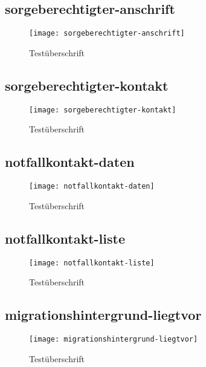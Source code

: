 \begin{landscape}
\subsection{sorgeberechtigter-anschrift}
\begin{figure}[H]
    \centering
    \caption{Testüberschrift}
    \begin{adjustbox}{width=0.85\linewidth, center}
        \texttt{[image: sorgeberechtigter-anschrift]}
    \end{adjustbox}
\end{figure}

\subsection{sorgeberechtigter-kontakt}
\begin{figure}[H]
    \centering
    \caption{Testüberschrift}
    \begin{adjustbox}{width=0.6\linewidth, center}
        \texttt{[image: sorgeberechtigter-kontakt]}
    \end{adjustbox}
\end{figure}

\subsection{notfallkontakt-daten}
\begin{figure}[H]
    \centering
    \caption{Testüberschrift}
    \begin{adjustbox}{width=0.6\linewidth, center}
        \texttt{[image: notfallkontakt-daten]}
    \end{adjustbox}
\end{figure}

\subsection{notfallkontakt-liste}
\begin{figure}[H]
    \centering
    \caption{Testüberschrift}
    \begin{adjustbox}{width=\linewidth, center}
        \texttt{[image: notfallkontakt-liste]}
    \end{adjustbox}
\end{figure}

\subsection{migrationshintergrund-liegtvor}
\begin{figure}[H]
    \centering
    \caption{Testüberschrift}
    \begin{adjustbox}{width=\linewidth, center}
        \texttt{[image: migrationshintergrund-liegtvor]}
    \end{adjustbox}
\end{figure}


\end{landscape}
